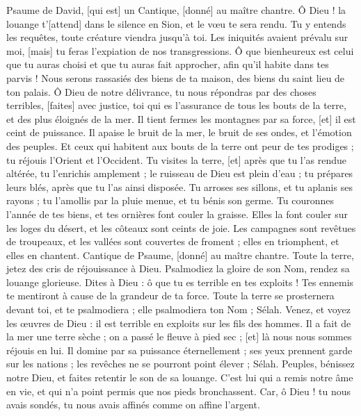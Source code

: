 \begin{multicols}{2}
\VerseOne{}Psaume de David, [qui est] un Cantique, [donné] au maître chantre. Ô Dieu ! la louange t'[attend] dans le silence en Sion, et le vœu te sera rendu.
Tu y entends les requêtes, toute créature viendra jusqu'à toi.
Les iniquités avaient prévalu sur moi, [mais] tu feras l'expiation de nos transgressions.
Ô que bienheureux est celui que tu auras choisi et que tu auras fait approcher, afin qu'il habite dans tes parvis ! Nous serons rassasiés des biens de ta maison, des biens du saint lieu de ton palais.
Ô Dieu de notre délivrance, tu nous répondras par des choses terribles, [faites] avec justice, toi qui es l'assurance de tous les bouts de la terre, et des plus éloignés de la mer.
Il tient fermes les montagnes par sa force, [et] il est ceint de puissance.
Il apaise le bruit de la mer, le bruit de ses ondes, et l'émotion des peuples.
Et ceux qui habitent aux bouts de la terre ont peur de tes prodiges ; tu réjouis l'Orient et l'Occident.
Tu visites la terre, [et] après que tu l'as rendue altérée, tu l'enrichis amplement ; le ruisseau de Dieu est plein d'eau ; tu prépares leurs blés, après que tu l'as ainsi disposée.
Tu arroses ses sillons, et tu aplanis ses rayons ; tu l'amollis par la pluie menue, et tu bénis son germe.
Tu couronnes l'année de tes biens, et tes ornières font couler la graisse.
Elles la font couler sur les loges du désert, et les côteaux sont ceints de joie.
Les campagnes sont revêtues de troupeaux, et les vallées sont couvertes de froment ; elles en triomphent, et elles en chantent.
\VerseOne{}Cantique de Psaume, [donné] au maître chantre. Toute la terre, jetez des cris de réjouissance à Dieu.
Psalmodiez la gloire de son Nom, rendez sa louange glorieuse.
Dites à Dieu : ô que tu es terrible en tes exploits ! Tes ennemis te mentiront à cause de la grandeur de ta force.
Toute la terre se prosternera devant toi, et te psalmodiera ; elle psalmodiera ton Nom ; Sélah.
Venez, et voyez les œuvres de Dieu : il est terrible en exploits sur les fils des hommes.
Il a fait de la mer une terre sèche ; on a passé le fleuve à pied sec ; [et] là nous nous sommes réjouis en lui.
Il domine par sa puissance éternellement ; ses yeux prennent garde sur les nations ; les revêches ne se pourront point élever ; Sélah.
Peuples, bénissez notre Dieu, et faites retentir le son de sa louange.
C'est lui qui a remis notre âme en vie, et qui n'a point permis que nos pieds bronchassent.
Car, ô Dieu ! tu nous avais sondés, tu nous avais affinés comme on affine l'argent.

\end{multicols}
